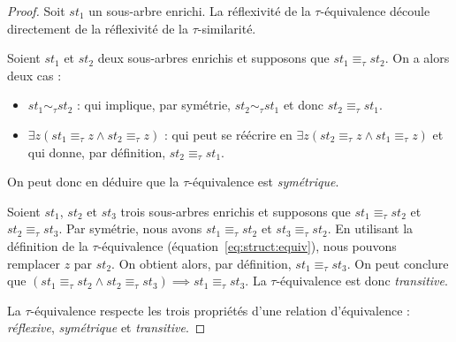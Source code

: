 \begin{proof}
    Soit $st_1$ un sous-arbre enrichi.
    La réflexivité de la $\tau$-équivalence découle directement de la réflexivité de la $\tau$-similarité.%

    Soient $st_1$ et $st_2$ deux sous-arbres enrichis et supposons que $st_1 \equiv_\tau st_2$.
    On a alors deux cas :
    \begin{itemize}
        \item $st_1 \sim_\tau st_2$ : qui implique, par symétrie, $st_2 \sim_\tau st_1$ et donc $st_2 \equiv_\tau st_1$.
        \item $\exists z (st_1 \equiv_\tau z \land st_2 \equiv_\tau z)$ : qui peut se réécrire en $\exists z (st_2 \equiv_\tau z \land st_1 \equiv_\tau z)$ et qui donne, par définition, $st_2 \equiv_\tau st_1$.
    \end{itemize}
    On peut donc en déduire que la $\tau$-équivalence est \emph{symétrique}.

    Soient $st_1$, $st_2$ et $st_3$ trois sous-arbres enrichis et supposons que $st_1 \equiv_\tau st_2$ et $st_2 \equiv_\tau st_3$.
    Par symétrie, nous avons $st_1 \equiv_\tau st_2$ et $st_3 \equiv_\tau st_2$.
    En utilisant la définition de la $\tau$-équivalence (équation~\ref{eq:struct:equiv}), nous pouvons remplacer $z$ par $st_2$.
    On obtient alors, par définition, $st_1 \equiv_\tau st_3$.
    On peut conclure que $(st_1 \equiv_\tau st_2 \land st_2 \equiv_\tau st_3) \implies st_1 \equiv_\tau st_3$.
    La $\tau$-équivalence est donc \emph{transitive}.

    La $\tau$-équivalence respecte les trois propriétés d'une relation d'équivalence : \emph{réflexive}, \emph{symétrique} et \emph{transitive}.
\end{proof}

